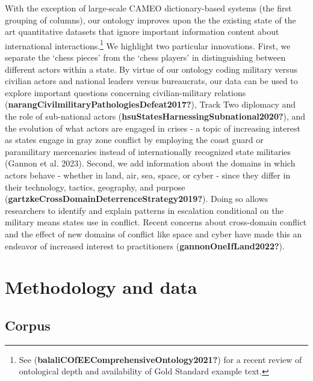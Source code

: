 \documentclass{article}
\begin{document}
With the exception of large-scale CAMEO dictionary-based systems (the
first grouping of columns), our ontology improves upon the the existing
state of the art quantitative datasets that ignore important information
content about international interactions.\footnote{See
  (\textbf{balaliCOfEEComprehensiveOntology2021?}) for a recent review
  of ontological depth and availability of Gold Standard example text.}
We highlight two particular innovations. First, we separate the `chess
pieces' from the `chess players' in distinguishing between different
actors within a state. By virtue of our ontology coding military versus
civilian actors and national leaders versus bureaucrats, our data can be
used to explore important questions concerning civilian-military
relations (\textbf{narangCivilmilitaryPathologiesDefeat2017?}), Track
Two diplomacy and the role of sub-national actors
(\textbf{hsuStatesHarnessingSubnational2020?}), and the evolution of
what actors are engaged in crises - a topic of increasing interest as
states engage in gray zone conflict by employing the coast guard or
paramilitary mercenaries instead of internationally recognized state
militaries (Gannon et al. 2023). Second, we add information about the
domains in which actors behave - whether in land, air, sea, space, or
cyber - since they differ in their technology, tactics, geography, and
purpose (\textbf{gartzkeCrossDomainDeterrenceStrategy2019?}). Doing so
allows researchers to identify and explain patterns in escalation
conditional on the military means states use in conflict. Recent
concerns about cross-domain conflict and the effect of new domains of
conflict like space and cyber have made this an endeavor of increased
interest to practitioners (\textbf{gannonOneIfLand2022?}).

\hypertarget{methodology-and-data}{%
\section{Methodology and data}\label{methodology-and-data}}

\hypertarget{corpus}{%
\subsection{Corpus}\label{corpus}}
\end{document}
